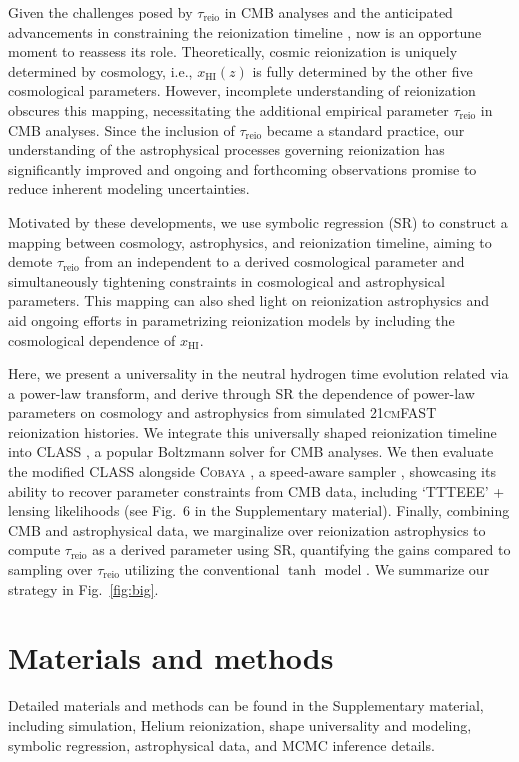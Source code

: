 \documentclass[12pt]{article}
\newcommand{\HI}{\mathrm{HI}}
\newcommand{\reio}{\mathrm{reio}}
\begin{document}
Given the challenges posed by $\tau_\reio$ in CMB analyses and the
anticipated advancements in constraining the reionization
timeline \cite{Montero2021, Hera2022}, now is an opportune moment to
reassess its role.
Theoretically, cosmic reionization is uniquely determined by cosmology,
i.e., $x_\HI(z)$ is fully determined by the other five cosmological
parameters.
However, incomplete understanding of reionization obscures this mapping,
necessitating the additional empirical parameter $\tau_\reio$ in CMB
analyses.
Since the inclusion of $\tau_\reio$ became a standard practice, our
understanding of the astrophysical processes governing reionization has
significantly improved \cite{Gnedin2022, Kannan2022,Murray2020, Fan2023}
and ongoing and forthcoming observations promise to reduce inherent
modeling uncertainties.

Motivated by these developments, we use symbolic regression (SR)
\cite{Cranmer2023, Graham2013} to construct a mapping between cosmology,
astrophysics, and reionization timeline, aiming to demote $\tau_\reio$
from an independent to a derived cosmological parameter and
simultaneously tightening constraints in cosmological and astrophysical
parameters.
This mapping can also shed light on reionization astrophysics and aid
ongoing efforts in parametrizing reionization models \cite{Trac2018,
Trac2022, Paoletti2024} by including the cosmological dependence of
$x_\HI$.

Here, we present a universality in the neutral hydrogen time evolution
related via a power-law transform, and derive through SR the
dependence of power-law parameters on cosmology and astrophysics from
simulated \textsc{21cmFAST} \cite{MesingerEtAl2011, Murray2020}
reionization histories.
We integrate this universally shaped reionization timeline into
\textsc{CLASS} \cite{Blas2011}, a popular Boltzmann solver for CMB
analyses.
We then evaluate the modified \textsc{CLASS} alongside \textsc{Cobaya}
\cite{Torrado2020}, a speed-aware sampler \cite{Lewis2002,
Lewis2013}, showcasing its ability to
recover parameter constraints from CMB data, including `TTTEEE' +
lensing likelihoods \cite{Planck2020c, Planck2020d} (see Fig.~6 in the Supplementary material).
Finally, combining CMB and astrophysical data, we marginalize over
reionization astrophysics to compute $\tau_\reio$ as a derived parameter
using SR, quantifying the gains compared to sampling over $\tau_\reio$
utilizing the conventional $\tanh$ model \cite{Lewis2008}.
We summarize our strategy in Fig.~\ref{fig:big}.


\section{Materials and methods}
Detailed materials and methods can be found in the Supplementary material, including simulation, Helium reionization, shape universality and modeling, symbolic regression, astrophysical data, and MCMC inference details. 
\end{document}
